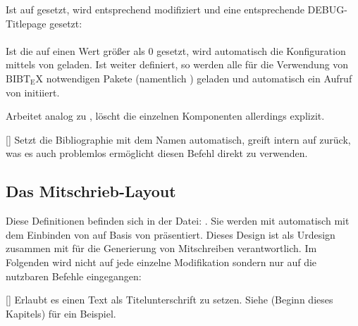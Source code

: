 Ist  auf  gesetzt, wird  entsprechend modifiziert und eine entsprechende DEBUG-Titlepage gesetzt:\smallskip\\
\makeatletter%
\framebox{%
    \@@Debug@Page@Content%
}~\\

Ist die  auf einen Wert größer als $0$ gesetzt, wird automatisch die Konfiguration mittels von  geladen. Ist weiter  definiert, so werden alle für die Verwendung von $\mathrm{B{\scriptstyle{IB}} \! T\!_{\displaystyle E} \! X}$ %
 notwendigen Pakete (namentlich ) geladen und automatisch ein Aufruf von  initiiert.

%
%
%

Arbeitet analog zu , löscht die einzelnen Komponenten allerdings explizit.

%
%
%

[]
Setzt die Bibliographie mit dem Namen  automatisch, greift intern auf  zurück, was es auch problemlos ermöglicht diesen Befehl direkt zu verwenden.

%
%
%
%
%

\subsection{Das Mitschrieb-Layout}
Diese Definitionen befinden sich in der Datei: . Sie werden mit  automatisch mit dem Einbinden von  auf Basis von  präsentiert. \newline
Dieses Design ist als Urdesign zusammen mit  für die Generierung von Mitschreiben verantwortlich. Im Folgenden wird nicht auf jede einzelne Modifikation sondern nur auf die nutzbaren Befehle eingegangen:
\begin{tcbraster}[raster columns=3, blankest,graphics pages={1,2,3},colback=white]
\end{tcbraster}

%
%
%

[]
Erlaubt es einen Text als Titelunterschrift zu setzen. Siehe  (Beginn dieses Kapitels) für ein Beispiel.

